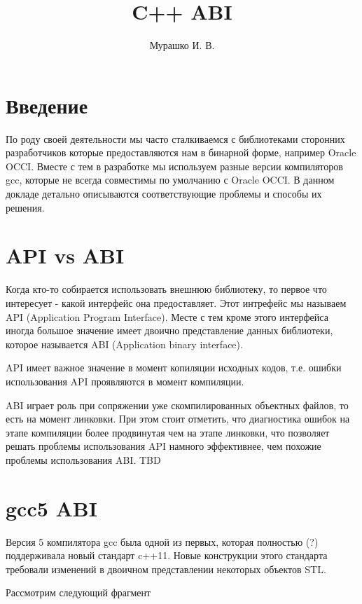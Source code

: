 \documentclass[14pt,a4paper]{article}
\title{C++ ABI}
\author{Мурашко И. В.}
\date{}
\begin{document}
\Russian

\maketitle

\section*{Введение}
По роду своей деятельности мы часто сталкиваемся с библиотеками сторонних 
разработчиков которые предоставляются нам в бинарной форме, например 
Oracle OCCI. Вместе с тем в разработке мы используем разные версии 
компиляторов gcc, которые не всегда совместимы по умолчанию с Oracle OCCI. 
В данном докладе детально описываются соответствующие проблемы и способы 
их решения. 

\section{API vs ABI}

Когда кто-то собирается использовать внешнюю библиотеку, то первое что
интересует - какой интерфейс она предоставляет. Этот интрефейс мы
называем API (Application Program Interface). Месте с тем кроме этого
интерфейса иногда большое 
значение имеет двоично представление данных библиотеки, которое
называется ABI (Application binary interface).

API имеет важное значение в момент копиляции исходных кодов, т.е.
ошибки использования API проявляются в момент компиляции.

ABI играет роль при сопряжении уже скомпилированных объектных файлов,
то есть на момент линковки. При этом стоит отметить, что диагностика
ошибок на этапе компиляции более продвинутая чем на этапе линковки,
что позволяет решать проблемы использования API намного эффективнее,
чем похожие проблемы использования ABI.
TBD

\section{gcc5 ABI}

Версия 5 компилятора gcc была одной из первых, которая полностью (?)
поддерживала новый стандарт c++11. Новые конструкции этого стандарта
требовали изменений в двоичном представлении некоторых объектов STL.

Рассмотрим следующий фрагмент
\inputminted{c++}{./src/sizes.cpp}
\end{document}
